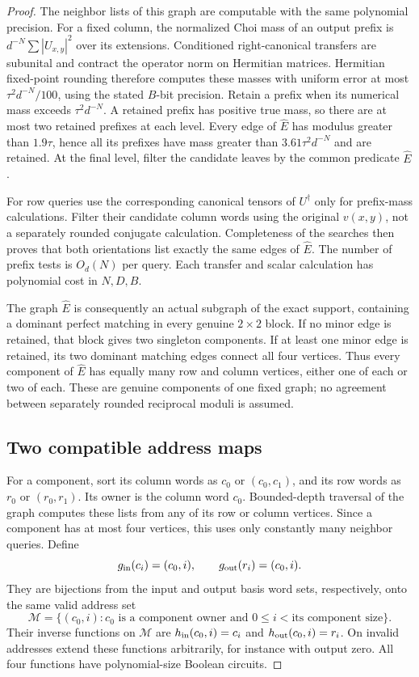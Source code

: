 \documentclass[11pt]{article}
\begin{document}
\begin{proof}
The neighbor lists of this graph are computable with the
same polynomial precision.
For a fixed column, the normalized Choi mass of an output
prefix is
$d^{-N}\sum|U_{x,y}|^2$ over its extensions.
Conditioned right-canonical transfers are subunital and
contract the operator norm on Hermitian matrices.
Hermitian fixed-point rounding therefore computes these
masses with uniform error at most $\tau^2d^{-N}/100$,
using the stated $B$-bit precision.
Retain a prefix when its numerical mass exceeds
$\tau^2d^{-N}$. A retained prefix has positive true mass,
so there are at most two retained prefixes at each level.
Every edge of $\widehat E$ has modulus greater than
$1.9\tau$, hence all its prefixes have mass greater than
$3.61\tau^2d^{-N}$ and are retained.
At the final level, filter the candidate leaves by the
common predicate $\widehat E$.

For row queries use the corresponding canonical tensors
of $U^\dagger$ only for prefix-mass calculations.
Filter their candidate column words using the original
$v(x,y)$, not a separately rounded conjugate calculation.
Completeness of the searches then proves that both
orientations list exactly the same edges of $\widehat E$.
The number of prefix tests is $O_d(N)$ per query.
Each transfer and scalar calculation has polynomial
cost in $N,D,B$.

The graph $\widehat E$ is consequently an actual subgraph
of the exact support, containing a dominant perfect matching
in every genuine $2\times2$ block.
If no minor edge is retained, that block gives two singleton
components. If at least one minor edge is retained, its two
dominant matching edges connect all four vertices.
Thus every component of $\widehat E$ has equally many row
and column vertices, either one of each or two of each.
These are genuine components of one fixed graph; no
agreement between separately rounded reciprocal moduli
is assumed.

\subsection*{Two compatible address maps}

For a component, sort its column words as
$c_0$ or $(c_0,c_1)$, and its row words as
$r_0$ or $(r_0,r_1)$.
Its owner is the column word $c_0$.
Bounded-depth traversal of the graph computes these lists
from any of its row or column vertices.
Since a component has at most four vertices, this uses
only constantly many neighbor queries.
Define
\[
 g_{\rm in}(c_i)=(c_0,i),\qquad
 g_{\rm out}(r_i)=(c_0,i).
\]
They are bijections from the input and output basis word
sets, respectively, onto the same valid address set
\[
 \mathcal M=\{(c_0,i):
       c_0\text{ is a component owner and }
       0\le i<\text{its component size}\}.
\]
Their inverse functions on $\mathcal M$ are
$h_{\rm in}(c_0,i)=c_i$ and
$h_{\rm out}(c_0,i)=r_i$.
On invalid addresses extend these functions arbitrarily,
for instance with output zero. All four functions have
polynomial-size Boolean circuits.


\end{proof}
\end{document}
